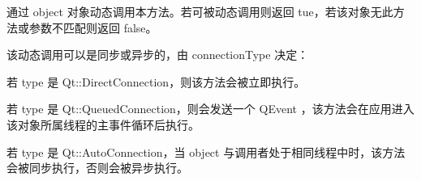 通过 object 对象动态调用本方法。若可被动态调用则返回 tue，若该对象无此方法或参数不匹配则返回 false。

该动态调用可以是同步或异步的，由 connectionType 决定：

\begin{compactitem}
\item 若 type 是 Qt::DirectConnection，则该方法会被立即执行。
\item 若 type 是 Qt::QueuedConnection，则会发送一个 QEvent ，该方法会在应用进入该对象所属线程的主事件循环后执行。
\item 若 type 是 Qt::AutoConnection，当 object 与调用者处于相同线程中时，该方法会被同步执行，否则会被异步执行。
\end{compactitem}